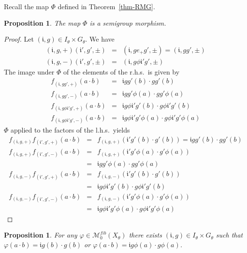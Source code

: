 \documentclass[10pt,a4paper]{amsart}
\newtheorem{prop}[theorem]{Proposition}
\numberwithin{equation}{section}
\newcommand{\ii}{{\mathfrak i}}
\newcommand{\M}{\mathcal M}
\newcommand{\Sfib}{\M^{fib}_0(X_\theta)}
\begin{document}
Recall the map $\Phi$ defined in Theorem~\ref{thm-RMG}.
\begin{prop}
The map $\Phi$ is a semigroup morphism.
\end{prop}

\begin{proof}  Let $(\ii,g)\in I_\theta\times G_\theta$.
We have 
\begin{eqnarray*}
(\ii,g,+)(\ii',g',\pm) &=& (\ii,ge_+ g',\pm) = (\ii,g g',\pm)\\
(\ii,g,-)(\ii',g',\pm) &=&  (\ii,g \phi\ii' g',\pm)
\end{eqnarray*}
The image under $\Phi$ of the elements of the r.h.s.\ is given by 
\begin{eqnarray*}
f_{(\ii ,gg',+)}(a\cdot b) &=& \ii gg' (b)\cdot gg'(b)\\
f_{(\ii ,gg',-)}(a\cdot b) &=& \ii gg' \phi(a)\cdot g g'\phi(a)\\
f_{(\ii ,g\phi\ii' g',+)}(a\cdot b) &=& \ii g\phi\ii' g' (b)\cdot g \phi\ii' g'(b)\\
f_{(\ii ,g\phi\ii' g',-)}(a\cdot b) &=& \ii g\phi\ii' g' \phi(a)\cdot g \phi\ii' g'\phi(a)\end{eqnarray*}
$\Phi$ applied to the factors of the l.h.s.\ yields
\begin{eqnarray*}  f_{(\ii ,g,+)}f_{(\ii' ,g',+)}(a\cdot b)   &=& 
f_{(\ii ,g,+)}(\ii' g'(b)\cdot g'(b))= \ii gg'(b)\cdot gg'(b)\\
f_{(\ii ,g,+)}f_{(\ii' ,g',-)}(a\cdot b)   &=& 
f_{(\ii ,g,+)}(\ii' g'\phi(a)\cdot g'\phi(a))\\
& =& \ii gg'\phi(a)\cdot gg'\phi(a)\\
f_{(\ii ,g,-)}f_{(\ii' ,g',+)}(a\cdot b)   &=& 
f_{(\ii ,g,-)}(\ii' g'(b)\cdot g'(b))\\
& =& \ii g \phi \ii' g'(b)\cdot g \phi \ii' g'(b)\\
f_{(\ii ,g,-)}f_{(\ii' ,g',-)}(a\cdot b)   &=& 
f_{(\ii ,g,-)}(\ii' g'\phi(a)\cdot g'\phi(a))\\
& =& \ii g\phi\ii' g' \phi(a)\cdot g \phi\ii' g'\phi(a)\end{eqnarray*}
\end{proof}
\begin{prop}\label{prop-rueck}
For any $\varphi\in \Sfib$ there exists $(\ii,g)\in I_\theta\times G_\theta$ such that $\varphi(a\cdot b) = \ii g(b)\cdot g(b)$ or $\varphi(a\cdot b) = \ii g\phi(a)\cdot g\phi(a)$.
\end{prop}
\end{document}
